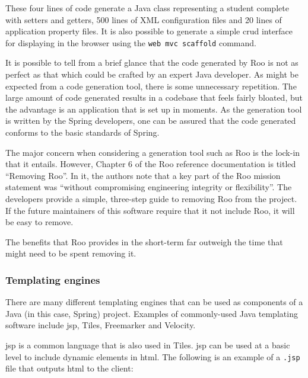 \documentclass[draft]{scrartcl}
\begin{document}
These four lines of code generate a Java class representing a student complete
with setters and getters, 500 lines of XML configuration files and 20 lines of
application property files. It is also possible to generate a simple
\gls{crud} interface for displaying in the browser using the \texttt{web mvc
scaffold} command.

It is possible to tell from a brief glance that the code generated by Roo is
not as perfect as that which could be crafted by an expert Java developer. As
might be expected from a code generation tool, there is some unnecessary
repetition. The large amount of code generated results in a codebase that
feels fairly bloated, but the advantage is an application that is set up in
moments. As the generation tool is written by the Spring developers, one can
be assured that the code generated conforms to the basic standards of Spring.

The major concern when considering a generation tool such as Roo is the
lock-in that it entails. However, Chapter 6 of the Roo reference documentation
\cite{RooReferenceDocs2011} is titled ``Removing Roo''. In it, the authors
note that a key part of the Roo mission statement was ``without compromising
engineering integrity or flexibility''. The developers provide a simple,
three-step guide to removing Roo from the project. If the future maintainers
of this software require that it not include Roo, it will be easy to remove.

The benefits that Roo provides in the short-term far outweigh the time that
might need to be spent removing it.

\subsubsection{Templating engines}


There are many different templating engines that can be used as components of
a Java (in this case, Spring) project. Examples of commonly-used Java
templating software include \gls{jsp}, Tiles, Freemarker and Velocity.


\gls{jsp} is a common language that is also used in Tiles. \gls{jsp} can be
used at a basic level to include dynamic elements in \gls{html}. The following
is an example of a \texttt{.jsp} file that outputs \gls{html} to the client:
\end{document}
